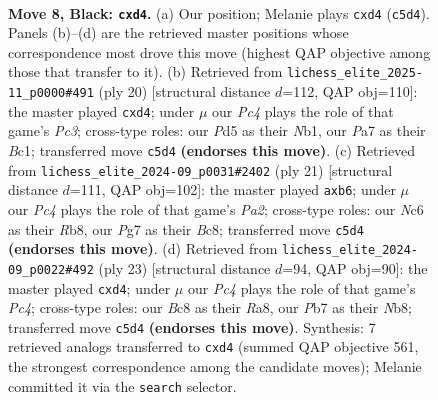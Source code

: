 \documentclass[11pt]{article}
\begin{document}
\begin{figure}[p]\centering
\begin{subfigure}{0.46\textwidth}\centering
\resizebox{\linewidth}{!}{%
\newchessgame
\chessboard[
  setfen={r1bqkb2/pp1n1ppr/2n1p3/2ppP3/3P4/2P2P2/PP1N2PP/R1BQK1NR b KQq - 0 8},
  showmover=false,
  pgfstyle=straightmove, color=movearrow, markmove={c5-d4}
]}
\caption{}
\end{subfigure}\hfill
\begin{subfigure}{0.46\textwidth}\centering
\resizebox{\linewidth}{!}{%
\newchessgame
\chessboard[
  setfen={r1bqkb1r/5ppp/p2p1n2/1pp5/3pP3/1PP2N2/1P3PPP/RNBQR1K1 w kq - 1 11},
  showmover=false,
  pgfstyle=straightmove, color=movearrow, markmove={c3-d4}
]}
\caption{}
\end{subfigure}
\\[4pt]
\begin{subfigure}{0.46\textwidth}\centering
\resizebox{\linewidth}{!}{%
\newchessgame
\chessboard[
  setfen={1rbqk2r/p3ppb1/1Pp2n2/2p4p/2N1P1p1/3PB3/1PP2PPP/RN1QK2R b KQk - 0 11},
  showmover=false,
  pgfstyle=straightmove, color=movearrow, markmove={a7-b6}
]}
\caption{}
\end{subfigure}\hfill
\begin{subfigure}{0.46\textwidth}\centering
\resizebox{\linewidth}{!}{%
\newchessgame
\chessboard[
  setfen={rn1qkb1r/1p1n1pp1/p3p1p1/2ppP3/3P2P1/2P4P/PP2NPB1/R1BQK2R b KQkq - 0 12},
  showmover=false,
  pgfstyle=straightmove, color=movearrow, markmove={c5-d4}
]}
\caption{}
\end{subfigure}
\caption{\textbf{Move 8, Black: \texttt{cxd4}.} (a) Our position; Melanie plays \texttt{cxd4} (\texttt{c5d4}). Panels (b)--(d) are the retrieved master positions whose correspondence most drove this move (highest QAP objective among those that transfer to it). (b) Retrieved from \texttt{lichess\_elite\_2025-11\_p0000\#491} (ply 20) [structural distance $d$=112, QAP obj=110]: the master played \texttt{cxd4}; under $\mu$ our \emph{Pc4} plays the role of that game's \emph{Pc3}; cross-type roles: our \emph{P}d5 as their \emph{N}b1, our \emph{P}a7 as their \emph{B}c1; transferred move \texttt{c5d4} \textbf{(endorses this move)}. (c) Retrieved from \texttt{lichess\_elite\_2024-09\_p0031\#2402} (ply 21) [structural distance $d$=111, QAP obj=102]: the master played \texttt{axb6}; under $\mu$ our \emph{Pc4} plays the role of that game's \emph{Pa2}; cross-type roles: our \emph{N}c6 as their \emph{R}b8, our \emph{P}g7 as their \emph{B}c8; transferred move \texttt{c5d4} \textbf{(endorses this move)}. (d) Retrieved from \texttt{lichess\_elite\_2024-09\_p0022\#492} (ply 23) [structural distance $d$=94, QAP obj=90]: the master played \texttt{cxd4}; under $\mu$ our \emph{Pc4} plays the role of that game's \emph{Pc4}; cross-type roles: our \emph{B}c8 as their \emph{R}a8, our \emph{P}b7 as their \emph{N}b8; transferred move \texttt{c5d4} \textbf{(endorses this move)}. Synthesis: 7 retrieved analogs transferred to \texttt{cxd4} (summed QAP objective 561, the strongest correspondence among the candidate moves); Melanie committed it via the \texttt{search} selector.}
\label{fig:thought-m15}
\end{figure}
\end{document}
